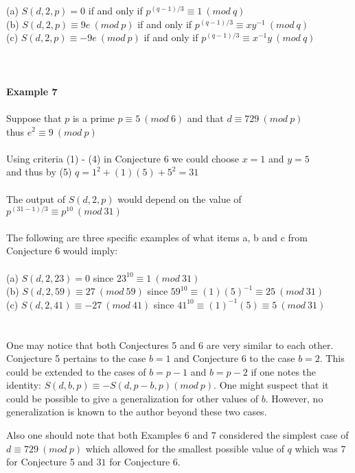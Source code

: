 \documentclass[final,letterpaper,oneside,10pt]{article}
\begin{document}
\\
\\
(a) $S(d,2,p) = 0$ if and only if $p^{(q-1)/3} \equiv 1~(mod~q)$
\\
(b) $S(d,2,p) \equiv 9e~(mod~p)$  if and only if $p^{(q-1)/3} \equiv xy^{-1}~(mod~q)$
\\
(c) $S(d,2,p) \equiv -9e~(mod~p)$  if and only if $p^{(q-1)/3} \equiv x^{-1}y~(mod~q)$
\\
\\
\\
\\
\textbf{Example 7}
\\
\\
Suppose that $p$ is a prime $p \equiv 5~(mod~6)$ and that $d \equiv 729~(mod~p)$ 
\\
thus $e^2 \equiv 9~(mod~p)$
\\
\\
Using criteria (1) - (4) in Conjecture 6 we could choose $x=1$ and $y=5$
\\
and thus by (5) $q = 1^2 + (1)(5) + 5^2 = 31$
\\
\\
The output of $S(d,2,p)$ would depend on the value of $p^{(31-1)/3} \equiv p^{10}~(mod~31)$
\\
\\
The following are three specific examples of what items a, b and c from Conjecture 6 would imply:
\\
\\
(a) $S(d,2,23) = 0$ since $23^{10} \equiv  1~(mod~31)$
\\
(b) $S(d,2,59) \equiv 27~(mod~59)$ since $59^{10} \equiv (1)(5)^{-1} \equiv 25~(mod~31)$
\\
(c) $S(d,2,41) \equiv -27~(mod~41)$ since $41^{10} \equiv (1)^{-1}(5) \equiv 5~(mod~31)$
\\
\\
\\
One may notice that both Conjectures 5 and 6 are very similar to each other.  Conjecture 5 pertains to the case $b=1$ and Conjecture 6 to the 
case $b=2$.  This could be extended to the cases of $b=p-1$ and $b=p-2$ if one notes the identity: $S(d,b,p) \equiv -S(d,p-b,p)(mod~p)$.
One might suspect that it could be possible to give a generalization for other values of $b$.  However, no generalization is known to the author 
beyond these two cases.

Also one should note that both Examples 6 and 7 considered the simplest case of $d \equiv 729~(mod~p)$ which allowed for the smallest possible 
value of $q$ which was $7$ for Conjecture 5 and $31$ for Conjecture 6.
\\
\end{document}
